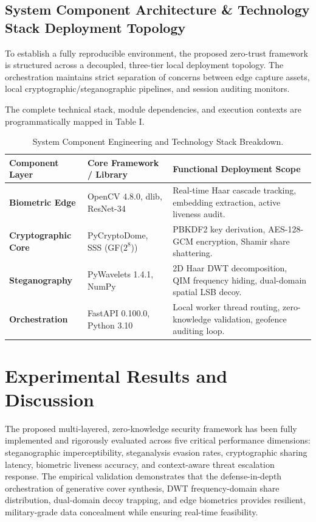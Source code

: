 \documentclass[conference]{IEEEtran}
\begin{document}
\subsection{System Component Architecture \& Technology Stack Deployment Topology}
To establish a fully reproducible environment, the proposed zero-trust framework is structured across a decoupled, three-tier local deployment topology. The orchestration maintains strict separation of concerns between edge capture assets, local cryptographic/steganographic pipelines, and session auditing monitors.

The complete technical stack, module dependencies, and execution contexts are programmatically mapped in Table I.

\begin{table}[t]
\centering
\caption{System Component Engineering and Technology Stack Breakdown.}
\label{tab:tech_stack}
\begin{tabular}{|p{2.2cm}|p{2.8cm}|p{2.8cm}|}
\hline
\textbf{Component Layer} & \textbf{Core Framework / Library} & \textbf{Functional Deployment Scope} \\ \hline
\textbf{Biometric Edge} & OpenCV 4.8.0, dlib, ResNet-34 & Real-time Haar cascade tracking, embedding extraction, active liveness audit. \\ \hline
\textbf{Cryptographic Core} & PyCryptoDome, SSS (GF($2^8$)) & PBKDF2 key derivation, AES-128-GCM encryption, Shamir share shattering. \\ \hline
\textbf{Steganography} & PyWavelets 1.4.1, NumPy & 2D Haar DWT decomposition, QIM frequency hiding, dual-domain spatial LSB decoy. \\ \hline
\textbf{Orchestration} & FastAPI 0.100.0, Python 3.10 & Local worker thread routing, zero-knowledge validation, geofence auditing loop. \\ \hline
\end{tabular}
\end{table}

\section{Experimental Results and Discussion}
The proposed multi-layered, zero-knowledge security framework has been fully implemented and rigorously evaluated across five critical performance dimensions: steganographic imperceptibility, steganalysis evasion rates, cryptographic sharing latency, biometric liveness accuracy, and context-aware threat escalation response. The empirical validation demonstrates that the defense-in-depth orchestration of generative cover synthesis, DWT frequency-domain share distribution, dual-domain decoy trapping, and edge biometrics provides resilient, military-grade data concealment while ensuring real-time feasibility.
\end{document}
